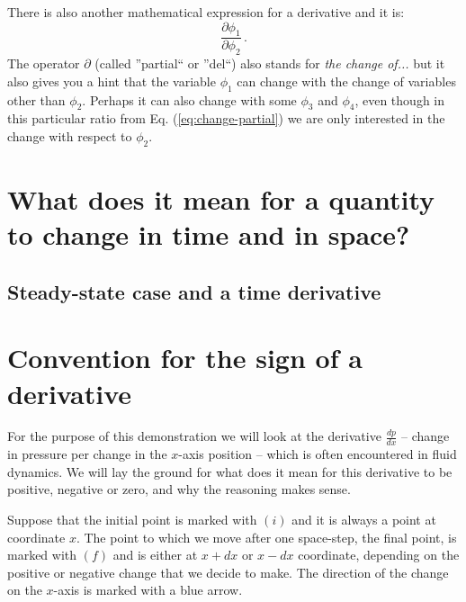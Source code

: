 There is also another mathematical expression for a derivative and it is:
\begin{equation*}\label{eq:change-partial}
\frac{\partial \phi_1}{\partial \phi_2} \, .
\end{equation*}
The operator $\partial$ (called ''partial`` or ''del``) also stands for \textit{the change of...} but it also gives you a hint that the variable $\phi_1$ can change with the change of variables other than $\phi_2$. Perhaps it can also change with some $\phi_3$ and $\phi_4$, even though in this particular ratio from Eq. (\ref{eq:change-partial}) we are only interested in the change with respect to $\phi_2$.

\section{What does it mean for a quantity to change in time and in space?}


\subsection{Steady-state case and a time derivative}

\section{Convention for the sign of a derivative}

For the purpose of this demonstration we will look at the derivative $\frac{dp}{dx}$ -- change in pressure per change in the $x$-axis position -- which is often encountered in fluid dynamics. We will lay the ground for what does it mean for this derivative to be positive, negative or zero, and why the reasoning makes sense.

Suppose that the initial point is marked with \textcolor{myblue}{$(i)$} and it is always a point at coordinate $x$. The point to which we move after one space-step, the final point, is marked with \textcolor{myblue}{$(f)$} and is either at $x+dx$ or $x - dx$ coordinate, depending on the positive or negative change that we decide to make. The direction of the change on the $x$-axis is marked with a blue arrow.

